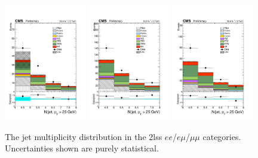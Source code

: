 \begin{figure}[htp]
\centering
\includegraphics[width=0.32\textwidth]{ch5_figs/nJets_ttH_ee_stackPlot_SR.pdf}
\includegraphics[width=0.32\textwidth]{ch5_figs/nJets_ttH_em_stackPlot_SR.pdf}
\includegraphics[width=0.32\textwidth]{ch5_figs/nJets_ttH_mm_stackPlot_SR.pdf} \\
\caption[Data/MC comparison of the jet multiplicity in the signal region]{The jet multiplicity distribution in the 2lss $ee$/$e\mu$/$\mu\mu$ categories. Uncertainties shown are purely statistical.}
\label{fig:sr_njets}
\end{figure}

